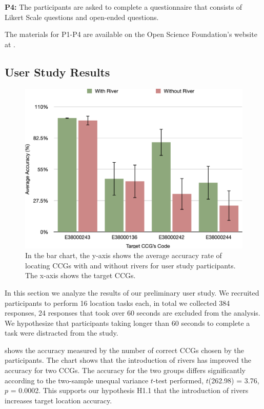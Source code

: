 \textbf{P4:} The participants are asked to complete a questionnaire that consists of Likert Scale questions and open-ended questions.

The materials for P1-P4 are available on the Open Science Foundation's website at .

\subsection{User Study Results}

{
    \begin{figure}[b!]
        \centering
        \includegraphics[width=\columnwidth,keepaspectratio]{figure/evaluation/accuracy.png}
        \caption{In the bar chart, the y-axis shows the average accuracy rate of locating CCGs with and without rivers for user study participants. The x-axis shows the target CCGs.}
        \label{fig:task-acc}
    \end{figure}
}


In this section we analyze the results of our preliminary user study. We recruited \pCount participants to perform 16 location tasks each, in total we collected 384 responses, 24 responses that took over 60 seconds are excluded from the analysis. We hypothesize that participants taking longer than 60 seconds to complete a task were distracted from the study.

  shows the accuracy measured by the number of correct CCGs chosen by the participants. The chart shows that the introduction of rivers has improved the accuracy for two CCGs. The accuracy for the two groups differs significantly according to the two-sample unequal variance $t$-test performed, $t$(262.98) = 3.76, $p$ = 0.0002. This supports our hypothesis H1.1 that the introduction of rivers increases target location accuracy.


